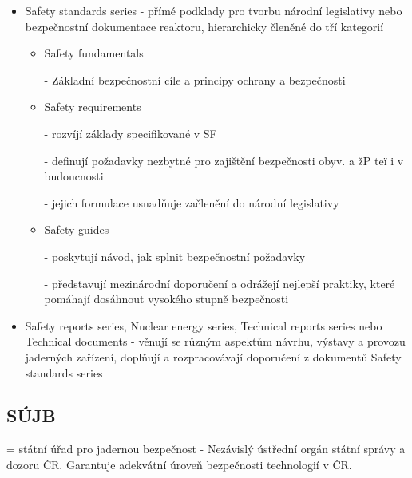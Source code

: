 \begin{itemize}

\item Safety standards series - přímé podklady pro tvorbu národní legislativy nebo bezpečnostní dokumentace reaktoru, hierarchicky členěné do tří kategorií

\begin{itemize}

        \item	Safety fundamentals 
        
            - Základní bezpečnostní cíle a principy ochrany a bezpečnosti

        \item	Safety requirements

            - rozvíjí základy specifikované v SF 

            - definují požadavky nezbytné pro zajištění bezpečnosti obyv. a žP teï i v budoucnosti

            - jejich formulace usnadňuje začlenění do národní legislativy

        \item	Safety guides

            - poskytují návod, jak splnit bezpečnostní požadavky

            - představují mezinárodní doporučení a odrážejí nejlepší praktiky, které pomáhají dosáhnout vysokého stupně bezpečnosti
\end{itemize}

\item Safety reports series, Nuclear energy series, Technical reports series nebo Technical documents - věnují se různým aspektům návrhu, výstavy a provozu jaderných zařízení, doplňují a rozpracovávají doporučení z dokumentů Safety standards series

\end{itemize}

\subsection{SÚJB} = státní úřad pro jadernou bezpečnost
- Nezávislý ústřední orgán státní správy a dozoru ČR. Garantuje adekvátní úroveň bezpečnosti technologií v ČR.

